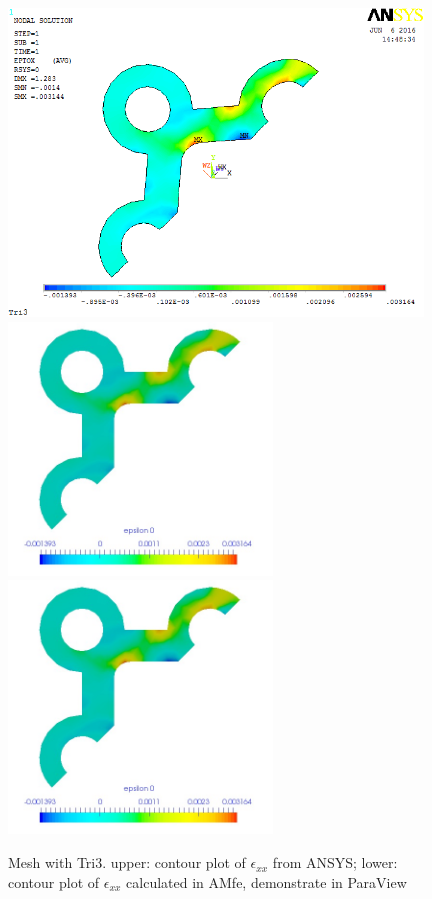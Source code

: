 \begin{figure}[htbp]
	\begin{center}
		\includegraphics[width=11cm,clip]{TTri3_Exx.png} 	
		\includegraphics[width=7cm,clip]{TTri3_Exx_PD.png} 	
		\includegraphics[width=7cm,clip]{TTri3_Exx_P.png} 	
		\caption{Mesh with Tri3. upper: contour plot of $\epsilon_{xx}$ from ANSYS; lower: contour plot of $\epsilon_{xx}$ calculated in AMfe, demonstrate in ParaView} \label{fig: Tri3_Exx}
	\end{center}
\end{figure}
\clearpage 


